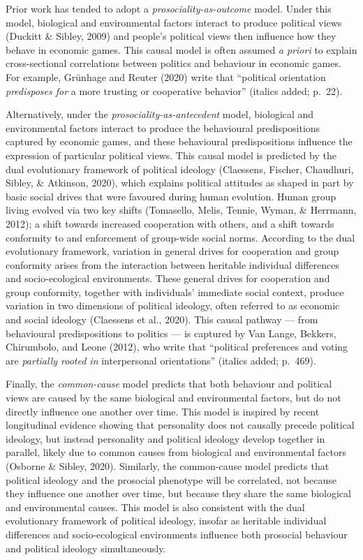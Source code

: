 \documentclass[
  man,floatsintext]{apa6}
\begin{document}
Prior work has tended to adopt a \emph{prosociality-as-outcome} model. Under this
model, biological and environmental factors interact to produce political
views (Duckitt \& Sibley, 2009) and people's political views then influence how they
behave in economic games. This causal model is often assumed \emph{a priori} to
explain cross-sectional correlations between politics and behaviour in economic
games. For example, Grünhage and Reuter (2020) write that ``political orientation
\emph{predisposes for} a more trusting or cooperative behavior'' (italics added; p.~22).

Alternatively, under the \emph{prosociality-as-antecedent} model, biological and
environmental factors interact to produce the behavioural predispositions
captured by economic games, and these behavioural predispositions influence the
expression of particular political views. This causal model is predicted by the
dual evolutionary framework of political ideology (Claessens, Fischer, Chaudhuri, Sibley, \& Atkinson, 2020), which
explains political attitudes as shaped in part by basic social drives that were
favoured during human evolution. Human group living evolved via two key shifts
(Tomasello, Melis, Tennie, Wyman, \& Herrmann, 2012); a shift towards increased cooperation with others, and a shift
towards conformity to and enforcement of group-wide social norms. According to
the dual evolutionary framework, variation in general drives for cooperation and
group conformity arises from the interaction between heritable individual
differences and socio-ecological environments. These general drives for
cooperation and group conformity, together with individuals' immediate social
context, produce variation in two dimensions of political ideology, often
referred to as economic and social ideology (Claessens et al., 2020). This causal
pathway --- from behavioural predispositions to politics --- is captured by
Van Lange, Bekkers, Chirumbolo, and Leone (2012), who write that ``political preferences and voting are \emph{partially
rooted in} interpersonal orientations'' (italics added; p.~469).

Finally, the \emph{common-cause} model predicts that both behaviour and political
views are caused by the same biological and environmental factors, but do not
directly influence one another over time. This model is inspired by recent
longitudinal evidence showing that personality does not causally precede
political ideology, but instead personality and political ideology develop
together in parallel, likely due to common causes from biological and
environmental factors (Osborne \& Sibley, 2020). Similarly, the common-cause model predicts
that political ideology and the prosocial phenotype will be correlated, not
because they influence one another over time, but because they share the same
biological and environmental causes. This model is also consistent with the dual
evolutionary framework of political ideology, insofar as heritable individual
differences and socio-ecological environments influence both prosocial
behaviour and political ideology simultaneously.
\end{document}
